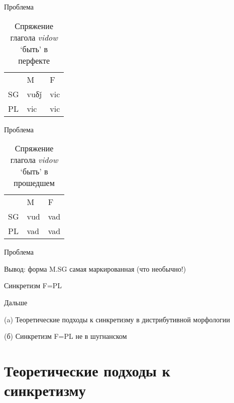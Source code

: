 \documentclass[xcolor=table]{beamer}
\begin{document}
\begin{frame}{Проблема}
\begin{table}[h]
\centering
\caption{Спряжение глагола \textit{vidow} `быть' в перфекте}
\begin{tabular}{lll}
   & M                         & F                         \\
SG & vuδǰ                        & \cellcolor[HTML]{FCFF2F}vic \\
PL & \cellcolor[HTML]{FFFE65}vic & \cellcolor[HTML]{FCFF2F}vic
\end{tabular}
\end{table}

\end{frame}

\begin{frame}{Проблема}

\begin{table}[h]
\centering
\caption{Спряжение глагола \textit{vidow} `быть' в прошедшем}
\begin{tabular}{lll}
   & M                         & F                         \\
SG & vud                     & \cellcolor[HTML]{FCFF2F}vad \\
PL & \cellcolor[HTML]{FFFE65}vad & \cellcolor[HTML]{FCFF2F}vad
\end{tabular}
\end{table}

\end{frame}

\begin{frame}{Проблема}
	
	Вывод: форма M.SG самая маркированная (что необычно!)

	Синкретизм F=PL
	
\end{frame}

\begin{frame}{Дальше}

	(a) Теоретические подходы к синкретизму в дистрибутивной морфологии

	(б) Синкретизм F=PL не в шугнанском

\end{frame}

\section{Теоретические подходы к синкретизму}
\end{document}
